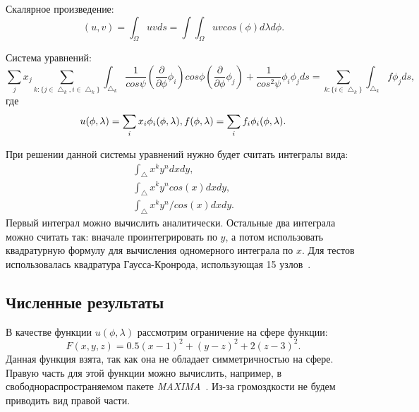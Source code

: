 \documentclass[a4paper,article]{article}
\begin{document}
\begin{eqaution*}
Скалярное произведение:
\begin{equation*}
(u, v) = \int_\Omega u v ds = \int\int_\Omega u v cos(\phi)d\lambda d\phi.
\end{equation*}

Система уравнений:
\begin{equation*}
\sum_j x_j \sum_{k: \{j\in\bigtriangleup_k,
  i\in\bigtriangleup_k\}}\int_{\bigtriangleup_k}\frac{1}{cos\psi}(\frac{\partial}{\partial
  \phi} \phi_i) cos\phi (\frac{\partial}{\partial \phi}
\phi_j)+\frac{1}{cos^2\psi}\phi_i\phi_j ds =
\sum_{k:\{i\in\bigtriangleup_k\}}\int_{\bigtriangleup_k}f \phi_j ds, 
\end{equation*}
где
\begin{equation*}
u(\phi,\lambda)=\sum_i x_i \phi_i(\phi, \lambda),\\
f(\phi,\lambda)=\sum_i f_i \phi_i(\phi, \lambda).
\end{equation*}

При решении данной системы уравнений нужно будет считать интегралы вида:
\begin{equation*}
\begin{split}
\int_\bigtriangleup x^k y^n dx dy,\\
\int_\bigtriangleup x^k y^n cos(x) dx dy,\\
\int_\bigtriangleup x^k y^n / cos(x) dx dy.
\end{split}
\end{equation*}
Первый интеграл можно вычислить аналитически. Остальные два интеграла
можно считать так: вначале проинтегрировать по $y$, а потом использовать
квадратурную формулу для вычисления одномерного интеграла по $x$. Для
тестов использовалась квадратура Гаусса-Кронрода, использующая 15
узлов~\cite{kronrod}.

\subsection*{Численные результаты}
В качестве функции $u(\phi,\lambda)$ рассмотрим ограничение на сфере
функции:
\begin{equation*}
F(x,y,z)=0.5(x-1)^2+(y-z)^2+2(z-3)^2.
\end{equation*}
Данная функция взята, так как она не обладает симметричностью на
сфере. Правую часть для этой функции можно вычислить, например, в
свободнораспространяемом пакете {\it MAXIMA}~\cite{maxima}. Из-за громоздкости не
будем приводить вид правой части. 


\end{eqaution*}
\end{document}
